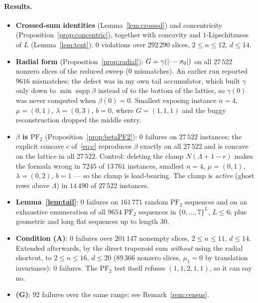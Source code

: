 \documentclass[11pt]{article}
\theoremstyle{definition}
\newcommand{\PFtwo}{\mathrm{PF}_2}
\DeclarePairedDelimiter{\abs}{\lvert}{\rvert}
\begin{document}
\paragraph{Results.}
\begin{itemize}
\item \textbf{Crossed-sum identities} (Lemma~\ref{lem:crossed}) and concentricity
(Proposition~\ref{prop:concentric}), together with concavity and $1$-Lipschitzness of $L$
(Lemma~\ref{lem:tent}): $0$ violations over $292\,290$ slices, $2\le n\le12$, $d\le14$.
\item \textbf{Radial form} (Proposition~\ref{prop:radial}): $G=\gamma(\abs{\cdot-\sigma_0})$
on all $27\,522$ nonzero slices of the reduced sweep ($0$ mismatches). An earlier run
reported $9616$ mismatches; the defect was in my own tail accumulator, which built $\gamma$
only down to $\min\operatorname{supp}\beta$ instead of to the bottom of the lattice, so
$\gamma(0)$ was never computed when $\beta(0)=0$. Smallest exposing instance $n=4$,
$\mu=(0,1)$, $\lambda=(0,3)$, $b=0$, where $G=(1,1,1)$ and the buggy reconstruction dropped
the middle entry.
\item \textbf{$\beta$ is $\PFtwo$} (Proposition~\ref{prop:betaPF2}): $0$ failures on
$27\,522$ instances; the explicit concave $c$ of~\eqref{eq:c} reproduces $\beta$ exactly on
all $27\,522$ and is concave on the lattice in all $27\,522$. Control: deleting the clamp
$N(\Lambda+1-r)$ makes the formula wrong in $7245$ of $13\,761$ instances, smallest $n=4$,
$\mu=(0,1)$, $\lambda=(0,2)$, $b=1$ --- so the clamp is load-bearing. The clamp is
\emph{active} (ghost rows above $\Lambda$) in $14\,490$ of $27\,522$ instances.
\item \textbf{Lemma~\ref{lem:tail}}: $0$ failures on $161\,771$ random $\PFtwo$ sequences
and on an exhaustive enumeration of all $9654$ $\PFtwo$ sequences in $\{0,\dots,7\}^{L}$,
$L\le6$; plus geometric and long flat sequences up to length $30$.
\item \textbf{Condition (A)}: $0$ failures over $201\,147$ nonempty slices,
$2\le n\le11$, $d\le14$. Extended afterwards, by the direct trapezoid sum
\emph{without} using the radial shortcut, to $2\le n\le 16$, $d\le20$
($89\,366$ nonzero slices, $\mu_1=0$ by translation invariance): $0$ failures. The
$\PFtwo$ test itself refuses $(1,1,2,1,1)$, so it can say no.
\item \textbf{(G)}: $92$ failures over the same range; see Remark~\ref{rem:census}.
\end{itemize}
\end{document}
